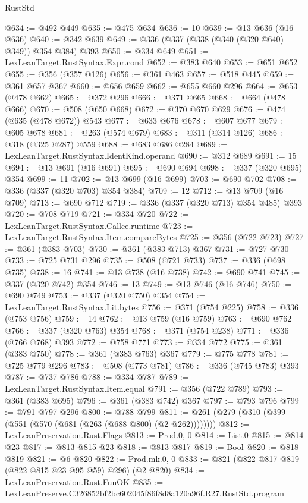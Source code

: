 \begin{lexlean}{RustStd}
\begin{coremodule}
@634 := @492 @449
@635 := @475 @634
@636 := 10
@639 := @13 @636 (@16 @636)
@640 := @342 @639
@649 := @336 (@337 (@338 (@340 (@320 @640) @349)) @354 @384) @393
@650 := @334 @649
@651 := LexLeanTarget.RustSyntax.Expr.cond
@652 := @383 @640
@653 := @651 @652
@655 := @356 (@357 @126)
@656 := @361 @463
@657 := @518 @445
@659 := @361 @657 @367
@660 := @656 @659
@662 := @655 @660 @296
@664 := @653 (@478 @662)
@665 := @372 @296
@666 := @371 @665
@668 := @664 (@478 @666)
@670 := @508 (@650 @668)
@672 := @370 @670 @629
@676 := @474 (@635 (@478 @672)) @543
@677 := @633 @676
@678 := @607 @677
@679 := @605 @678
@681 := @263 (@574 @679)
@683 := @311 (@314 @126)
@686 := @318 (@325 @287) @559
@688 := @683 @686 @284
@689 := LexLeanTarget.RustSyntax.IdentKind.operand
@690 := @312 @689
@691 := 15
@694 := @13 @691 (@16 @691)
@695 := @690 @694
@698 := @337 (@320 @695) @354
@699 := 11
@702 := @13 @699 (@16 @699)
@703 := @690 @702
@708 := @336 (@337 (@320 @703) @354 @384)
@709 := 12
@712 := @13 @709 (@16 @709)
@713 := @690 @712
@719 := @336 (@337 (@320 @713) @354 @485) @393
@720 := @708 @719
@721 := @334 @720
@722 := LexLeanTarget.RustSyntax.Callee.runtime
@723 := LexLeanTarget.RustSyntax.Item.compareBytes
@725 := @356 (@722 @723)
@727 := @361 (@383 @703)
@730 := @361 (@383 @713) @367
@731 := @727 @730
@733 := @725 @731 @296
@735 := @508 (@721 @733)
@737 := @336 (@698 @735)
@738 := 16
@741 := @13 @738 (@16 @738)
@742 := @690 @741
@745 := @337 (@320 @742) @354
@746 := 13
@749 := @13 @746 (@16 @746)
@750 := @690 @749
@753 := @337 (@320 @750) @354
@754 := LexLeanTarget.RustSyntax.Lit.bytes
@756 := @371 (@754 @225)
@758 := @336 (@753 @756)
@759 := 14
@762 := @13 @759 (@16 @759)
@763 := @690 @762
@766 := @337 (@320 @763) @354
@768 := @371 (@754 @238)
@771 := @336 (@766 @768) @393
@772 := @758 @771
@773 := @334 @772
@775 := @361 (@383 @750)
@778 := @361 (@383 @763) @367
@779 := @775 @778
@781 := @725 @779 @296
@783 := @508 (@773 @781)
@786 := @336 (@745 @783) @393
@787 := @737 @786
@788 := @334 @787
@789 := LexLeanTarget.RustSyntax.Item.equal
@791 := @356 (@722 @789)
@793 := @361 (@383 @695)
@796 := @361 (@383 @742) @367
@797 := @793 @796
@799 := @791 @797 @296
@800 := @788 @799
@811 := @261 (@279 (@310 (@399 (@551 (@570 (@681 (@263 (@688 @800) (@2 @262))))))))
@812 := LexLeanPreservation.Rust.Flags
@813 := Prod.{0, 0}
@814 := List.{0}
@815 := @814 @23
@817 := @813 @815 @23
@818 := @813 @817
@819 := Bool
@820 := @818 @819
@821 := @6 @820
@822 := Prod.mk.{0, 0}
@833 := @821 (@822 @817 @819 (@822 @815 @23 @95 @59) @296) (@2 @820)
@834 := LexLeanPreservation.Rust.FunOK
@835 := LexLeanPreserve.C326852bf2bc602045f86f8d8a120a96f.R27.RustStd.program

\end{coremodule}
\end{lexlean}
